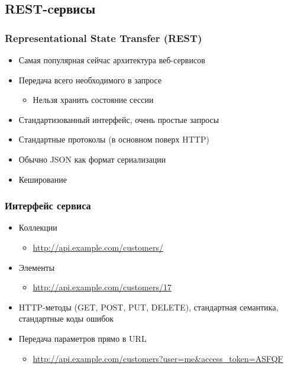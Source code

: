 \documentclass{../../slides-style}
\begin{document}
    \subsection{REST-cервисы}

    \begin{frame}
        \frametitle{Representational State Transfer (REST)}
        \begin{itemize}
            \item Самая популярная сейчас архитектура веб-сервисов
            \item Передача всего необходимого в запросе
            \begin{itemize}
                \item Нельзя хранить состояние сессии
            \end{itemize}
            \item Стандартизованный интерфейс, очень простые запросы
            \item Стандартные протоколы (в основном поверх HTTP)
            \item Обычно JSON как формат сериализации
            \item Кеширование
        \end{itemize}
    \end{frame}

    \begin{frame}
        \frametitle{Интерфейс сервиса}
        \begin{itemize}
            \item Коллекции
            \begin{itemize}
                \item \url{http://api.example.com/customers/}
            \end{itemize}
            \item Элементы
            \begin{itemize}
                \item \url{http://api.example.com/customers/17}
            \end{itemize}
            \item HTTP-методы (GET, POST, PUT, DELETE), стандартная семантика, стандартные коды ошибок
            \item Передача параметров прямо в URL
            \begin{itemize}
                \item \url{http://api.example.com/customers?user=me&access_token=ASFQF}
            \end{itemize}
        \end{itemize}
    \end{frame}
\end{document}
